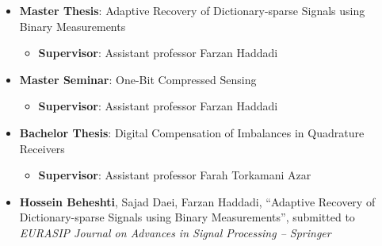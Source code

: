 

\begin{itemize}
	\item{
	      \textbf{Master Thesis}: Adaptive Recovery of Dictionary-sparse Signals using Binary Measurements
	      \begin{itemize}
		      \item \textbf{Supervisor}: Assistant professor Farzan Haddadi
	      \end{itemize}
	      }
	\item{
	      \textbf{Master Seminar}: One-Bit Compressed Sensing
	      \begin{itemize}
		      \item \textbf{Supervisor}: Assistant professor Farzan Haddadi
	      \end{itemize}
	      }
	\item{
	      \textbf{Bachelor Thesis}: Digital Compensation of Imbalances in Quadrature Receivers
	      \begin{itemize}
		      \item \textbf{Supervisor}: Assistant professor Farah Torkamani Azar
	      \end{itemize}
	      }

	\item{
	      \textbf{Hossein Beheshti}, Sajad Daei, Farzan Haddadi, ``Adaptive Recovery of Dictionary-sparse Signals using Binary Measurements'',
	      submitted to \emph{EURASIP Journal on Advances in Signal Processing -- Springer}
	      }
	      \\
\end{itemize}

